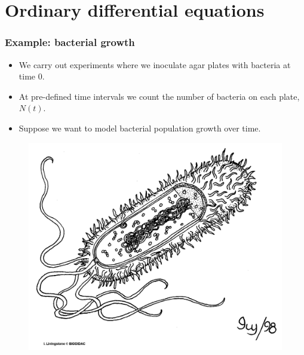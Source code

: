 \documentclass[handout]{beamer}
\begin{document}
\section{Ordinary differential equations}
\frame{\tableofcontents[currentsection]}

\begin{frame}
	\frametitle{Example: bacterial growth}
	\begin{itemize}
		\item<2-> We carry out experiments where we inoculate agar plates with bacteria at time 0.
		\item<3-> At pre-defined time intervals we count the number of bacteria on each plate, $N(t)$.
		\item<4-> Suppose we want to model bacterial population growth over time.
	\end{itemize}
	
	\begin{figure}[ht]
		\centerline{\includegraphics[width=1\textwidth]{./Figures/bacteria.png}}
	\end{figure}
	
\end{frame}
\end{document}
